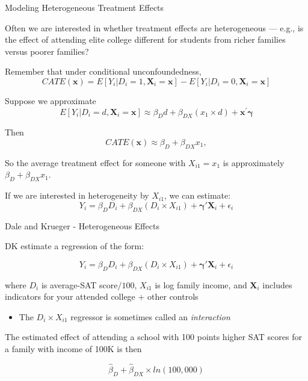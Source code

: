 \documentclass[11pt,english,handout]{beamer}
\newenvironment{wideitemize}{\itemize\addtolength{\itemsep}{10pt}}{\enditemize}
\begin{document}
\begin{frame}{Modeling Heterogeneous Treatment Effects}
	\begin{wideitemize}
		\item
		Often we are interested in whether treatment effects are heterogeneous --- e.g., is the effect of attending elite college different for students from richer families versus poorer families? 
		
		\pause
		\item
		Remember that under conditional unconfoundedness, 
		$$CATE(\bm{x}) = E[ Y_i | D_i = 1, \bm{X}_i = \bm{x} ] - E[ Y_i | D_i = 0, \bm{X}_i = \bm{x} ]$$
		
		\pause
		\item
		Suppose we approximate 
		$$E[Y_i | D_i = d, \bm{X}_i = \bm{x} ] \approx \beta_D  d  + \beta_{DX} (x_{1} \times d) +  \bm{x}^\prime \bm\gamma$$
		
		\pause
		\item
		Then
		$$CATE(\bm{x}) \approx \beta_D + \beta_{DX} x_{1} ,$$
		
		\noindent So the average treatment effect for someone with $X_{i1} = x_1$ is approximately $\beta_D + \beta_{DX} x_1$.
		
		\pause
		\item
		If we are interested in heterogeneity by $X_{i1}$, we can estimate:
		$$Y_{i} = \beta_D D_i + \beta_{DX} (D_i \times X_{i1}) + \bm{\gamma}'\bm{X}_i  + \epsilon_i$$
	\end{wideitemize}
\end{frame}


\begin{frame}{Dale and Krueger - Heterogeneous Effects}
	\begin{wideitemize}
		\item
		DK estimate a regression of the form: 
		
		$$Y_{i} = \beta_D D_i + \beta_{DX} (D_i \times X_{i1}) + \bm{\gamma}'\bm{X}_i  + \epsilon_i$$
		
		\noindent where $D_i$ is average-SAT score$/100$, $X_{i1}$ is log family income, and $\bm{X}_i$ includes indicators for your attended college + other controls\pause{}\smallskip
		\begin{itemize}
		\item The $D_i\times X_{i1}$ regressor is sometimes called an \emph{interaction}
		\end{itemize}
		
		\pause
		\item
		The estimated effect of attending a school with 100 points higher SAT scores for a family with income of 100K is then \pause
		
		$$\hat\beta_D + \hat\beta_{DX} \times ln(100,000) $$
	\end{wideitemize}
\end{frame}
\end{document}

